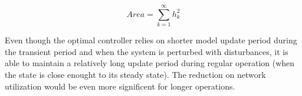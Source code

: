 \documentclass[letterpaper, 10 pt, conference]{ieeeconf}\IEEEoverridecommandlockouts%
\begin{document}
\begin{equation}
	Area = \sum_{k=1}^\infty h_k^2
\end{equation}

Even though the optimal controller relies on shorter model update period during the transient period and when the system is perturbed with disturbances, it is able to maintain a relatively long update period during regular operation (when the state is close enought to its steady state). The reduction on network utilization would be even more significent for longer operations.






\end{document}
